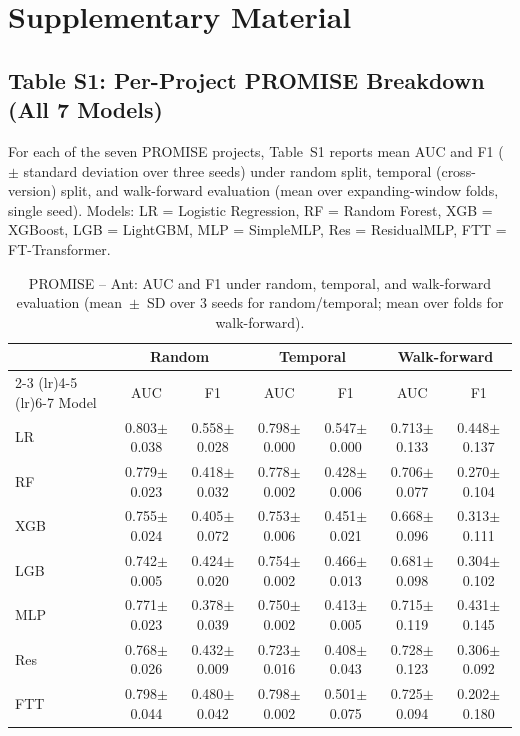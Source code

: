 \section*{Supplementary Material}

\subsection*{Table S1: Per-Project PROMISE Breakdown (All 7 Models)}

For each of the seven PROMISE projects, Table~S1 reports mean AUC and F1
($\pm$ standard deviation over three seeds) under random split, temporal
(cross-version) split, and walk-forward evaluation (mean over expanding-window
folds, single seed). Models: LR = Logistic Regression, RF = Random Forest,
XGB = XGBoost, LGB = LightGBM, MLP = SimpleMLP, Res = ResidualMLP,
FTT = FT-Transformer.


\begin{table}[htbp]
\centering
\caption{PROMISE -- Ant: AUC and F1 under random, temporal, and walk-forward evaluation (mean~$\pm$~SD over 3 seeds for random/temporal; mean over folds for walk-forward).}
\label{tab:supp-ant}
\scriptsize
\begin{tabular}{l cc cc cc}
\toprule
 & \multicolumn{2}{c}{Random} & \multicolumn{2}{c}{Temporal} & \multicolumn{2}{c}{Walk-forward} \\
\cmidrule(lr){2-3} \cmidrule(lr){4-5} \cmidrule(lr){6-7}
Model & AUC & F1 & AUC & F1 & AUC & F1 \\
\midrule
LR & 0.803$\pm$0.038 & 0.558$\pm$0.028 & 0.798$\pm$0.000 & 0.547$\pm$0.000 & 0.713$\pm$0.133 & 0.448$\pm$0.137 \\
RF & 0.779$\pm$0.023 & 0.418$\pm$0.032 & 0.778$\pm$0.002 & 0.428$\pm$0.006 & 0.706$\pm$0.077 & 0.270$\pm$0.104 \\
XGB & 0.755$\pm$0.024 & 0.405$\pm$0.072 & 0.753$\pm$0.006 & 0.451$\pm$0.021 & 0.668$\pm$0.096 & 0.313$\pm$0.111 \\
LGB & 0.742$\pm$0.005 & 0.424$\pm$0.020 & 0.754$\pm$0.002 & 0.466$\pm$0.013 & 0.681$\pm$0.098 & 0.304$\pm$0.102 \\
MLP & 0.771$\pm$0.023 & 0.378$\pm$0.039 & 0.750$\pm$0.002 & 0.413$\pm$0.005 & 0.715$\pm$0.119 & 0.431$\pm$0.145 \\
Res & 0.768$\pm$0.026 & 0.432$\pm$0.009 & 0.723$\pm$0.016 & 0.408$\pm$0.043 & 0.728$\pm$0.123 & 0.306$\pm$0.092 \\
FTT & 0.798$\pm$0.044 & 0.480$\pm$0.042 & 0.798$\pm$0.002 & 0.501$\pm$0.075 & 0.725$\pm$0.094 & 0.202$\pm$0.180 \\
\bottomrule
\end{tabular}
\end{table}

